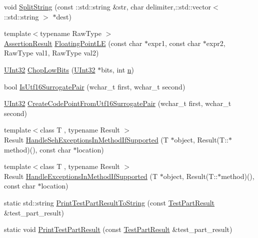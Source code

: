 \begin{DoxyCompactItemize}
\item 
void \hyperlink{namespacetesting_1_1internal_aa013dc1d62981cbad93c2fffa0192921}{Split\+String} (const \+::std\+::string \&str, char delimiter,\+::std\+::vector$<$ \+::std\+::string $>$ $\ast$dest)
\item 
{\footnotesize template$<$typename Raw\+Type $>$ }\\\hyperlink{classtesting_1_1AssertionResult}{Assertion\+Result} \hyperlink{namespacetesting_1_1internal_a17b52b6b1f81f6dcad5cc4d12e5173a6}{Floating\+Point\+LE} (const char $\ast$expr1, const char $\ast$expr2, Raw\+Type val1, Raw\+Type val2)
\item 
\hyperlink{namespacetesting_1_1internal_a40d4fffcd2bf56f18b1c380615aa85e3}{U\+Int32} \hyperlink{namespacetesting_1_1internal_a2c54b453387aa8a18f2f3e09f10b5a7d}{Chop\+Low\+Bits} (\hyperlink{namespacetesting_1_1internal_a40d4fffcd2bf56f18b1c380615aa85e3}{U\+Int32} $\ast$bits, int \hyperlink{app_2main_8cpp_acfc02ec89670db29251fda6a66602ce2}{n})
\item 
bool \hyperlink{namespacetesting_1_1internal_a681895f8cc32286211be9889da107394}{Is\+Utf16\+Surrogate\+Pair} (wchar\+\_\+t first, wchar\+\_\+t second)
\item 
\hyperlink{namespacetesting_1_1internal_a40d4fffcd2bf56f18b1c380615aa85e3}{U\+Int32} \hyperlink{namespacetesting_1_1internal_ac8ef1bb10cd9e69de939789b759e6bc9}{Create\+Code\+Point\+From\+Utf16\+Surrogate\+Pair} (wchar\+\_\+t first, wchar\+\_\+t second)
\item 
{\footnotesize template$<$class T , typename Result $>$ }\\Result \hyperlink{namespacetesting_1_1internal_ac5293b438139ef7ed05cb7fcaaf63545}{Handle\+Seh\+Exceptions\+In\+Method\+If\+Supported} (T $\ast$object, Result(T\+::$\ast$method)(), const char $\ast$location)
\item 
{\footnotesize template$<$class T , typename Result $>$ }\\Result \hyperlink{namespacetesting_1_1internal_addb2ed165b92b74e25fe9ebe9e46b9f9}{Handle\+Exceptions\+In\+Method\+If\+Supported} (T $\ast$object, Result(T\+::$\ast$method)(), const char $\ast$location)
\item 
static std\+::string \hyperlink{namespacetesting_1_1internal_ada13cbf91139f0809a5a31ea2594c1ad}{Print\+Test\+Part\+Result\+To\+String} (const \hyperlink{classtesting_1_1TestPartResult}{Test\+Part\+Result} \&test\+\_\+part\+\_\+result)
\item 
static void \hyperlink{namespacetesting_1_1internal_ac844b3d05dd6f665f72e2a1cec1872ba}{Print\+Test\+Part\+Result} (const \hyperlink{classtesting_1_1TestPartResult}{Test\+Part\+Result} \&test\+\_\+part\+\_\+result)

\end{DoxyCompactItemize}
